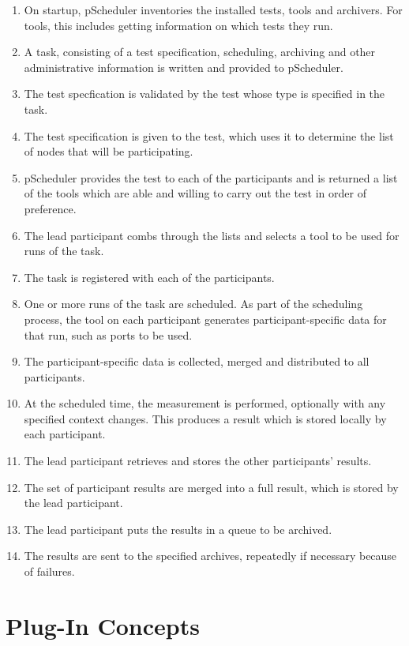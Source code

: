 \documentclass[10pt,titlepage]{article}
\begin{document}
\begin{enumerate}
\item On startup, pScheduler inventories the installed tests, tools
  and archivers.  For tools, this includes getting information on
  which tests they run.
\item A task, consisting of a test specification, scheduling,
  archiving and other administrative information is written and
  provided to pScheduler.
\item The test specfication is validated by the test whose type is
  specified in the task.
\item The test specification is given to the test, which uses it to
  determine the list of nodes that will be participating.
\item pScheduler provides the test to each of the participants and is
  returned a list of the tools which are able and willing to carry out
  the test in order of preference.
\item The lead participant combs through the lists and selects a tool
  to be used for runs of the task.
\item The task is registered with each of the participants.
\item One or more runs of the task are scheduled.  As part of the
  scheduling process, the tool on each participant generates
  participant-specific data for that run, such as ports to be used.
\item The participant-specific data is collected, merged and
  distributed to all participants.
\item At the scheduled time, the measurement is performed, optionally
  with any specified context changes.  This produces a result which is
  stored locally by each participant.
\item The lead participant retrieves and stores the other
  participants' results.
\item The set of participant results are merged into a full result,
  which is stored by the lead participant.
\item The lead participant puts the results in a queue to be archived.
\item The results are sent to the specified archives, repeatedly if
  necessary because of failures.
\end{enumerate}


\section{Plug-In Concepts}
\end{document}
